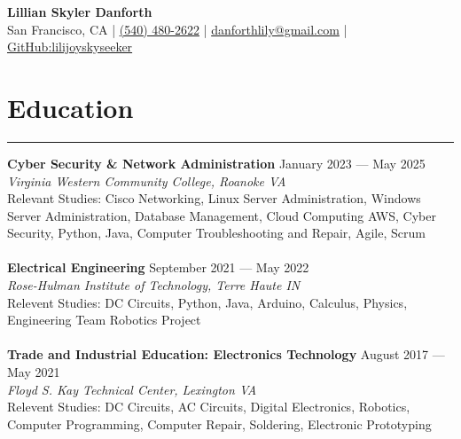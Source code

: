 \documentclass[a4paper,11pt]{article}
\begin{document}
\begin{center}
    {\LARGE \textbf{Lillian Skyler Danforth}} \\
    \vspace{0.2cm}
    \small
    San Francisco, CA | \href{tel:+15404802622}{(540) 480-2622} | \href{mailto:danforthlily@gmail.com}{danforthlily@gmail.com} | \href{https://github.com/lilijoyskyseeker}{GitHub:lilijoyskyseeker} \\
    \vspace{-0.4cm}
\end{center}
    
\section*{\hspace*{1em} Education}
\vspace{-0.2cm}
\hrule
\vspace{0.3cm}
\textbf{\hspace*{1em}Cyber Security \& Network Administration}
\hfill January 2023 — May 2025 \\
\textit{Virginia Western Community College, Roanoke VA} \\
Relevant Studies: Cisco Networking, Linux Server Administration, Windows Server Administration, Database Management, Cloud Computing AWS, Cyber Security, Python, Java, Computer Troubleshooting and Repair, Agile, Scrum \\
\vspace{-0.3cm} \\
\textbf{\hspace*{1em}Electrical Engineering}
\hfill September 2021 — May 2022 \\
\textit{Rose-Hulman Institute of Technology, Terre Haute IN} \\
Relevent Studies: DC Circuits, Python, Java, Arduino, Calculus, Physics, Engineering Team Robotics Project \\
\vspace{-0.3cm} \\
\textbf{\hspace*{1em}Trade and Industrial Education: Electronics Technology}
\hfill August 2017 — May 2021 \\
\textit{Floyd S. Kay Technical Center, Lexington VA} \\
Relevent Studies: DC Circuits, AC Circuits, Digital Electronics, Robotics, Computer Programming, Computer Repair, Soldering, Electronic Prototyping\\
\end{document}
